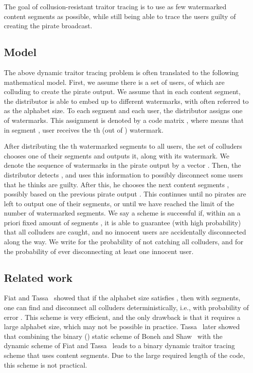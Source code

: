 \documentclass[10pt,a4paper,twocolumn]{article}
\begin{document}
The goal of collusion-resistant traitor tracing is to use as few watermarked content segments as possible, while still being able to trace the users guilty of creating the pirate broadcast.

\subsection{Model}

The above dynamic traitor tracing problem is often translated to the following mathematical model. First, we assume there is a set of  users,  of which are colluding to create the pirate output. We assume that in each content segment, the distributor is able to embed up to  different watermarks, with  often referred to as the alphabet size. To each segment and each user, the distributor assigns one of  watermarks. This assignment is denoted by a code matrix , where  means that in segment , user  receives the th (out of ) watermark. 

After distributing the th watermarked segments to all users, the set of colluders chooses one of their segments and outputs it, along with its watermark. We denote the sequence of watermarks in the pirate output by a vector . Then, the distributor detects , and uses this information to possibly disconnect some users that he thinks are guilty. After this, he chooses the next content segments , possibly based on the previous pirate output . This continues until no pirates are left to output one of their segments, or until we have reached the limit of the number of watermarked segments. We say a scheme is successful if, within an a priori fixed amount of segments , it is able to guarantee (with high probability) that all colluders are caught, and no innocent users are accidentally disconnected along the way. We write  for the probability of not catching all colluders, and  for the probability of ever disconnecting at least one innocent user.

\subsection{Related work}

Fiat and Tassa~\cite{fiat01} showed that if the alphabet size  satisfies , then with  segments, one can find and disconnect all colluders deterministically, i.e., with probability of error . This scheme is very efficient, and the only drawback is that it requires a large alphabet size, which may not be possible in practice. Tassa~\cite{tassa05} later showed that combining the binary () static scheme of Boneh and Shaw~\cite{boneh98} with the dynamic scheme of Fiat and Tassa~\cite{fiat01} leads to a binary dynamic traitor tracing scheme that uses  content segments. Due to the large required length of the code, this scheme is not practical.
\end{document}
